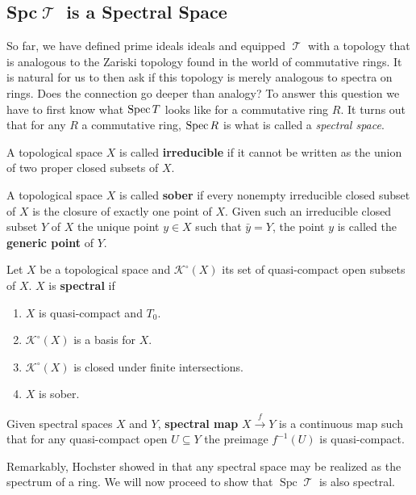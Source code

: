 \documentclass[11pt]{article}
\DeclareMathOperator{\TT}{\mathcal{T}}
\DeclareMathOperator{\spc}{Spc}
\begin{document}
\subsection{Spc\texorpdfstring{$\TT$}{𝓣} is a Spectral Space}

So far, we have defined prime ideals ideals and equipped $\TT$ with a topology that is analogous to the Zariski topology found in the world of commutative rings. It is natural for us to then ask if this topology is merely analogous to spectra on rings. Does the connection go deeper than analogy? To answer this question we have to first know what $\operatorname{Spec} T$ looks like for a commutative ring $R$. It turns out that for any $R$ a commutative ring, $\operatorname{Spec} R$ is what is called a \textit{spectral space}.

\begin{defn}
A topological space $X$ is called \textbf{irreducible} if it cannot be written as the union of two proper closed subsets of $X$.

A topological space $X$ is called \textbf{sober} if every nonempty irreducible closed subset of $X$ is the closure of exactly one point of $X$. Given such an irreducible closed subset $Y$ of $X$ the unique point $y \in X$ such that $\bar y = Y$, the point $y$ is called the \textbf{generic point} of $Y$.
\end{defn}

\begin{defn}
Let $X$ be a topological space and $\mathcal{K}^\circ(X)$ its set of quasi-compact open subsets of $X$. $X$ is \textbf{spectral} if
\begin{enumerate}[1.]
\item $X$ is quasi-compact and $T_0$.
	\item $\mathcal{K}^{\circ}(X)$ is a basis for $X$.
	\item $\mathcal{K}^\circ(X)$ is closed under finite intersections.
	\item $X$ is sober.
\end{enumerate}
Given spectral spaces $X$ and $Y$,  \textbf{spectral map} $X \xrightarrow{f} Y$ is a continuous map such that for any quasi-compact open $U \subseteq Y$ the preimage $f^{-1}(U)$ is quasi-compact.
\end{defn}

Remarkably, Hochster showed in \cite{Hochster:1969} that any spectral space may be realized as the spectrum of a ring. We will now proceed to show that $\spc \TT$ is also spectral.
\end{document}
